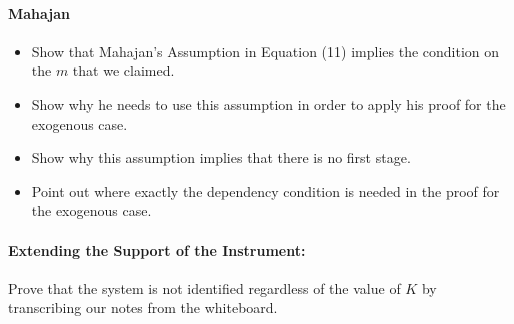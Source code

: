 \paragraph{Mahajan}
\begin{itemize}
  \item Show that Mahajan's Assumption in Equation (11) implies the condition on the $m$ that we claimed.
  \item Show why he needs to use this assumption in order to apply his proof for the exogenous case. 
  \item Show why this assumption implies that there is no first stage.
  \item Point out where exactly the dependency condition is needed in the proof for the exogenous case.
\end{itemize}

\paragraph{Extending the Support of the Instrument:}
Prove that the system is not identified regardless of the value of $K$ by transcribing our notes from the whiteboard.
